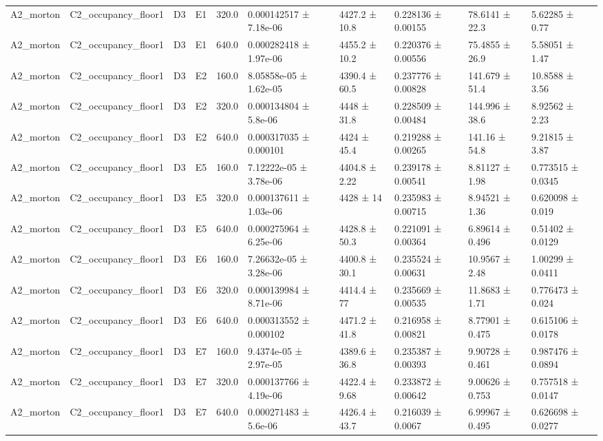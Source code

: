 \begin{table}
\begin{tabular}{llllllllll}
A2\_morton & C2\_occupancy\_floor1 & D3 & E1 & 320.0 & 0.000142517 ± 7.18e-06 & 4427.2 ± 10.8 & 0.228136 ± 0.00155 & 78.6141 ± 22.3 & 5.62285 ± 0.77 \\
A2\_morton & C2\_occupancy\_floor1 & D3 & E1 & 640.0 & 0.000282418 ± 1.97e-06 & 4455.2 ± 10.2 & 0.220376 ± 0.00556 & 75.4855 ± 26.9 & 5.58051 ± 1.47 \\
A2\_morton & C2\_occupancy\_floor1 & D3 & E2 & 160.0 & 8.05858e-05 ± 1.62e-05 & 4390.4 ± 60.5 & 0.237776 ± 0.00828 & 141.679 ± 51.4 & 10.8588 ± 3.56 \\
A2\_morton & C2\_occupancy\_floor1 & D3 & E2 & 320.0 & 0.000134804 ± 5.8e-06 & 4448 ± 31.8 & 0.228509 ± 0.00484 & 144.996 ± 38.6 & 8.92562 ± 2.23 \\
A2\_morton & C2\_occupancy\_floor1 & D3 & E2 & 640.0 & 0.000317035 ± 0.000101 & 4424 ± 45.4 & 0.219288 ± 0.00265 & 141.16 ± 54.8 & 9.21815 ± 3.87 \\
A2\_morton & C2\_occupancy\_floor1 & D3 & E5 & 160.0 & 7.12222e-05 ± 3.78e-06 & 4404.8 ± 2.22 & 0.239178 ± 0.00541 & 8.81127 ± 1.98 & 0.773515 ± 0.0345 \\
A2\_morton & C2\_occupancy\_floor1 & D3 & E5 & 320.0 & 0.000137611 ± 1.03e-06 & 4428 ± 14 & 0.235983 ± 0.00715 & 8.94521 ± 1.36 & 0.620098 ± 0.019 \\
A2\_morton & C2\_occupancy\_floor1 & D3 & E5 & 640.0 & 0.000275964 ± 6.25e-06 & 4428.8 ± 50.3 & 0.221091 ± 0.00364 & 6.89614 ± 0.496 & 0.51402 ± 0.0129 \\
A2\_morton & C2\_occupancy\_floor1 & D3 & E6 & 160.0 & 7.26632e-05 ± 3.28e-06 & 4400.8 ± 30.1 & 0.235524 ± 0.00631 & 10.9567 ± 2.48 & 1.00299 ± 0.0411 \\
A2\_morton & C2\_occupancy\_floor1 & D3 & E6 & 320.0 & 0.000139984 ± 8.71e-06 & 4414.4 ± 77 & 0.235669 ± 0.00535 & 11.8683 ± 1.71 & 0.776473 ± 0.024 \\
A2\_morton & C2\_occupancy\_floor1 & D3 & E6 & 640.0 & 0.000313552 ± 0.000102 & 4471.2 ± 41.8 & 0.216958 ± 0.00821 & 8.77901 ± 0.475 & 0.615106 ± 0.0178 \\
A2\_morton & C2\_occupancy\_floor1 & D3 & E7 & 160.0 & 9.4374e-05 ± 2.97e-05 & 4389.6 ± 36.8 & 0.235387 ± 0.00393 & 9.90728 ± 0.461 & 0.987476 ± 0.0894 \\
A2\_morton & C2\_occupancy\_floor1 & D3 & E7 & 320.0 & 0.000137766 ± 4.19e-06 & 4422.4 ± 9.68 & 0.233872 ± 0.00642 & 9.00626 ± 0.753 & 0.757518 ± 0.0147 \\
A2\_morton & C2\_occupancy\_floor1 & D3 & E7 & 640.0 & 0.000271483 ± 5.6e-06 & 4426.4 ± 43.7 & 0.216039 ± 0.0067 & 6.99967 ± 0.495 & 0.626698 ± 0.0277 \\

\end{tabular}
\end{table}
